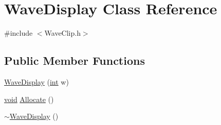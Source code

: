 \hypertarget{class_wave_display}{}\section{Wave\+Display Class Reference}
\label{class_wave_display}


{\ttfamily \#include $<$Wave\+Clip.\+h$>$}

\subsection*{Public Member Functions}
\begin{DoxyCompactItemize}
\item 
\hyperlink{class_wave_display_a4729c968e3cafeefa21064e266fd2220}{Wave\+Display} (\hyperlink{xmltok_8h_a5a0d4a5641ce434f1d23533f2b2e6653}{int} w)
\item 
\hyperlink{sound_8c_ae35f5844602719cf66324f4de2a658b3}{void} \hyperlink{class_wave_display_ab8b228309a2699299e591641ccfebcb7}{Allocate} ()
\item 
\hyperlink{class_wave_display_a846896ad756c9847b33f54984cf9080b}{$\sim$\+Wave\+Display} ()
\end{DoxyCompactItemize}
